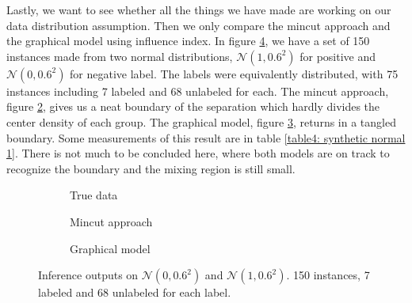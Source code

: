 Lastly, we want to see whether all the things we have made are working on our data distribution assumption. Then we only compare the mincut approach and the graphical model using influence index. In figure \ref{fig4: synthetic data: normal distribution 1}, we have a set of 150 instances made from two normal distributions, $\mathcal{N}(1, 0.6^2)$ for positive and $\mathcal{N}(0, 0.6^2)$ for negative label. The labels were equivalently distributed, with 75 instances including 7 labeled and 68 unlabeled for each. The mincut approach, figure \ref{fig4b: synthetic data: normal distribution 1}, gives us a neat boundary of the separation which hardly divides the center density of each group. The graphical model, figure \ref{fig4c: synthetic data: normal distribution 1}, returns in a tangled boundary. Some measurements of this result are in table \ref{table4: synthetic normal 1}. There is not much to be concluded here, where both models are on track to recognize the boundary and the mixing region is still small.

\begin{figure}[ht!]
	\centering
	\captionsetup[subfigure]{justification=centering}
	\begin{subfigure}[b]{0.31\textwidth}
		\centering
		
		\caption{True data}
		\label{fig4a: synthetic data: normal distribution 1}
	\end{subfigure}
	\hfill
	\begin{subfigure}[b]{0.31\textwidth}
		\centering
		
		\caption{Mincut approach}
		\label{fig4b: synthetic data: normal distribution 1}
	\end{subfigure}
	\hfill
	\begin{subfigure}[b]{0.31\textwidth}
		\centering
		
		\caption{Graphical model}
		\label{fig4c: synthetic data: normal distribution 1}
	\end{subfigure}
	\caption[Inference outputs on $\mathcal{N}(0, 0.6^2)$ and $\mathcal{N}(1, 0.6^2)$.]{Inference outputs on $\mathcal{N}(0, 0.6^2)$ and $\mathcal{N}(1, 0.6^2)$. 150 instances, 7 labeled and 68 unlabeled for each label.}
	\label{fig4: synthetic data: normal distribution 1}
\end{figure}


